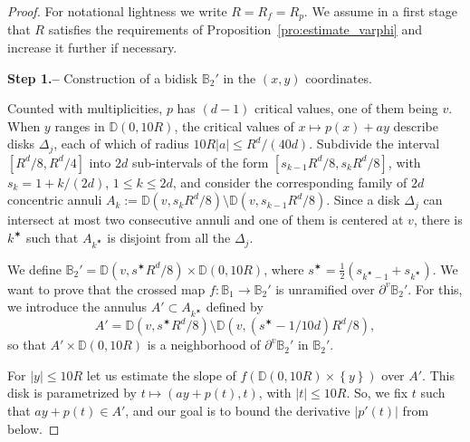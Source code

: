 \documentclass[oneside, 12pt]{amsart}
\newcommand{\disk}{\mathbb{D}}
\newcommand{\fr}{\partial}
\newcommand{\set}[1]{\left\{#1\right\}}
\newcommand{\abs}[1]{\left\vert#1\right\vert}
\newcommand{\unsur}[1]{\frac{1}{#1}}
\newcommand{\cst}{\mathrm{C}^\mathrm{st}}
\newcommand{\bb}{\mathbb{B}}
\theoremstyle{plain}
\theoremstyle{definition}
\numberwithin{equation}{section}       %
\numberwithin{equation}{section}       %
\begin{document}
\begin{proof} For notational lightness we write $R=R_f = R_p$. We  assume in a first stage that $R$ satisfies the requirements of Proposition~\ref{pro:estimate_varphi} and increase it further if necessary.

\noindent\textbf {Step 1.-- } Construction  of a bidisk $\bb_2'$ in the $(x,y)$ coordinates. 

Counted with multiplicities,  $p$ has $(d-1)$ critical values, one of them being $v$. 
When $y$ ranges in $\disk(0, 10R)$, the critical values of $x\mapsto p(x)+ay$ describe  disks $\Delta_j$, each of which of radius $10 R \abs{a}\leq  R^d/(40d)$.  
Subdivide the interval $\left[ {R^d}/{8},  {R^d}/{4}\right]$ into $2d$ sub-intervals of the form
$\left[ s_{k-1}{R^d}/{8}, s_{k}  {R^d}/{8}\right]$, with $s_k = 1+k/(2d)$, $1\leq k\leq 2d$, and 
 consider the corresponding   family of $2d$ concentric annuli 
$A_k:= \disk(v, s_{k} R^d/8 )\setminus \disk(v, s_{k-1} R^d/8)$.  
Since a disk $\Delta_j$ can intersect at most two consecutive annuli and one of them is centered at $v$, there is $k^\varstar$ such that  $A_{k^\varstar}$   is disjoint from all the $\Delta_j$.

We define $\bb_2'=\disk(v,  s^\varstar R^d/8)\times \disk(0, 10 R)$, where $s^\varstar=  \unsur{2}(s_{k^\varstar-1}+s_{k^\varstar})$.
We want to prove that the crossed map $f:\bb_1\to \bb_2'$ is unramified over $\fr^v\bb_2'$. For this,  
we introduce  the annulus $A'\subset A_{k^\varstar}$ defined by
\[
A' =  \disk(v,  s^\varstar R^d/8)\setminus \disk(v,  (s^\varstar - 1/10d) R^d/8),
\] 
so that $A'\times \disk(0, 10 R)$ is a neighborhood 
of $\fr^v\bb_2'$ in $\bb_2'$.

For $\abs{y}\leq 10R$ let us  estimate the slope 
of $f(\disk(0, 10R)\times \set{y})$   
over $A'$. This disk is parametrized by $t\mapsto (ay+p(t), t)$, with $\abs{t}\leq 10R$.
So, %
we fix $t$ such that $ay+p(t)\in A'$, 
and our goal is to bound the derivative $\abs{p'(t)}$ from below. 


\end{proof}
\end{document}
